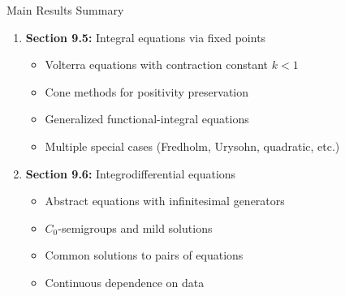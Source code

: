 \documentclass[aspectratio=169,10pt]{beamer}
\begin{document}
\begin{frame}{Main Results Summary}
\begin{enumerate}
    \item \textbf{Section 9.5:} Integral equations via fixed points
    \begin{itemize}
        \item Volterra equations with contraction constant $k < 1$
        \item Cone methods for positivity preservation
        \item Generalized functional-integral equations
        \item Multiple special cases (Fredholm, Urysohn, quadratic, etc.)
    \end{itemize}

    \vspace{1em}
    \item \textbf{Section 9.6:} Integrodifferential equations
    \begin{itemize}
        \item Abstract equations with infinitesimal generators
        \item $C_0$-semigroups and mild solutions
        \item Common solutions to pairs of equations
        \item Continuous dependence on data
    \end{itemize}
\end{enumerate}

\vspace{1em}
\end{frame}
\end{document}

